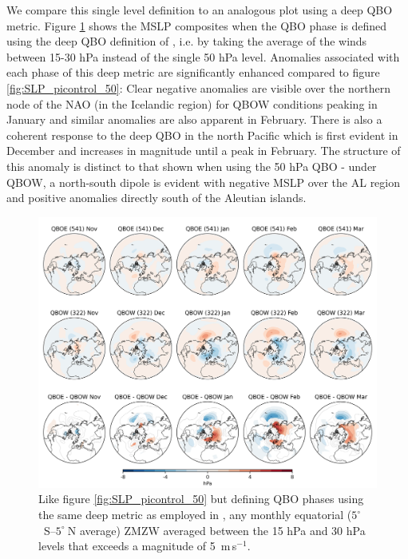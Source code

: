 We compare this single level definition to an analogous plot using a deep QBO metric. Figure \ref{fig:SLP_picontrol_deep} shows the MSLP composites when the QBO phase is defined using the deep QBO definition of \cite{andrewsObserved2019d}, i.e. by taking the average of the winds between 15-30 hPa instead of the single 50 hPa level. Anomalies associated with each phase of this deep metric are significantly enhanced compared to figure \ref{fig:SLP_picontrol_50}: Clear negative anomalies are visible over the northern node of the NAO (in the Icelandic region) for QBOW conditions peaking in January and similar anomalies are also apparent in February. There is also a coherent response to the deep QBO in the north Pacific which is first evident in December and increases in magnitude until a peak in February. The structure of this anomaly is distinct to that shown when using the 50 hPa QBO - under QBOW, a north-south dipole is evident with negative MSLP over the AL region and positive anomalies directly south of the Aleutian islands.

\begin{figure}[h!]
\begin{center}
\noindent\includegraphics[width = 0.8\linewidth]{Figures/Figures-deepQBO/LAGGED_SLP_composites_individual_months_QBO_phases_U_picontrol_deephPa_1thresh.png}
\caption[MSLP composites under different deep QBO phases in the pi-control simulation]{Like figure \ref{fig:SLP_picontrol_50} but defining QBO phases using the same deep metric as employed in \cite{andrewsObserved2019d}, any monthly equatorial ($5^{\circ}$\ S--$5^{\circ}\ $N average) ZMZW averaged between the 15 hPa and 30 hPa levels that exceeds a magnitude of 5\ m\,s$^{-1}$.}
\label{fig:SLP_picontrol_deep}
\end{center}
\end{figure}

